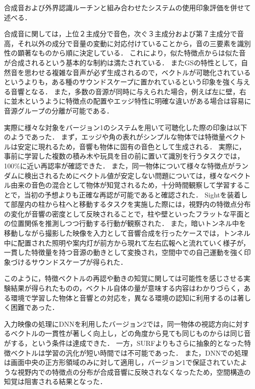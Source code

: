 合成音および外界認識ルーチンと組み合わせたシステムの使用印象評価を併せて述べる．

合成音に関しては，上位２主成分で音色，次ぐ３主成分および第７主成分で音高，それ以外の成分で音量の変動に対応付けていることから，音の三要素を識別性の顕著なものから順に決定している．
これにより，似た特徴点からは似た音が合成されるという基本的な制約は満たされている．
またGSの特性として，自然音を思わせる複雑な音声が必ず生成されるので，ベクトルが可聴化されているというよりも，ある種のサウンドスケープに置かれているという印象を強く与える音響となる．
また，多数の音源が同時に与えられた場合，例えば左に壁，右に並木というように特徴点の配置やエッジ特性に明確な違いがある場合は容易に音源グループの分離が可能である．

実際に様々な対象をバージョン1のシステムを用いて可聴化した際の印象は以下のようであった．
まず，エッジや角の表れがシンプルな物体では特徴量ベクトルは安定に現れるため，音響も物体に固有の音色として生成される．
実際に，事前に学習した複数の積み木や玩具を目の前に置いて識別を行うタスクでは，100\%に近い再認率が確認できた．
また，同一物体について様々な特徴点がランダムに検出されるためにベクトル値が安定しない問題については，様々なベクトル由来の音色の混合として物体が知覚されるため，十分時間観察して学習することで，当初の予想よりも正確な再認が可能であると確認された．
Sightを装着して部屋内の柱から柱へと移動するタスクを実施した際には，視野内の特徴点分布の変化が音響の密度として反映されることで，柱や壁といったフラットな平面との位置関係を推測しつつ行動する行動が観察された．
また，暗いトンネル中を移動しながら撮影した映像を入力として音響合成を行ったケースでは，トンネル中に配置された照明や案内灯が前方から現れて左右広報へと流れていく様子が，一貫した特徴量を持つ音源の動きとして変換され，空間中での自己運動を強く印象づけるサウンドスケープが得られた．

このように，特徴ベクトルの再認や動きの知覚に関しては可能性を感じさせる実験結果が得られたものの，ベクトル自体の量が意味する内容はわかりづらく，ある環境で学習した物体と音響との対応を，異なる環境の認知に利用するのは著しく困難であった．

入力映像の処理にDNNを利用したバージョン2では，同一物体の視認方向に対するベクトルの一貫性が著しく向上し，どの角度から見ても同じものからは同じ音がする，という条件は達成できた．
一方，SURFよりもさらに抽象的となった特徴ベクトルは学習の汎化が短い時間では不可能であった．
また，DNNでの処理は画面中央の正方形領域のみに対して適用し，バージョン1で保証されていたような視野内での特徴点の分布が合成音響に反映されなくなったため，空間構造の知覚は阻害される結果となった．

